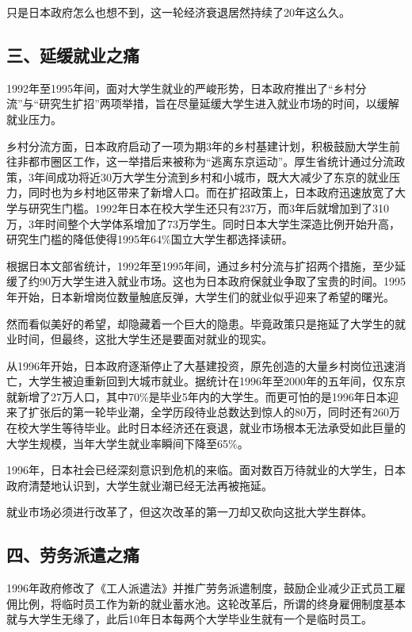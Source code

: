 只是日本政府怎么也想不到，这一轮经济衰退居然持续了20年这么久。

\subsection{三、延缓就业之痛}

1992年至1995年间，面对大学生就业的严峻形势，日本政府推出了“乡村分流”与“研究生扩招”两项举措，旨在尽量延缓大学生进入就业市场的时间，以缓解就业压力。

乡村分流方面，日本政府启动了一项为期3年的乡村基建计划，积极鼓励大学生前往非都市圈区工作，这一举措后来被称为“逃离东京运动”。厚生省统计通过分流政策，3年间成功将近30万大学生分流到乡村和小城市，既大大减少了东京的就业压力，同时也为乡村地区带来了新增人口。而在扩招政策上，日本政府迅速放宽了大学与研究生门槛。1992年日本在校大学生还只有237万，而3年后就增加到了310万，3年时间整个大学体系增加了73万学生。同时日本大学生深造比例开始升高，研究生门槛的降低使得1995年64\%国立大学生都选择读研。

根据日本文部省统计，1992年至1995年间，通过乡村分流与扩招两个措施，至少延缓了约90万大学生进入就业市场。这也为日本政府保就业争取了宝贵的时间。1995年开始，日本新增岗位数量触底反弹，大学生们的就业似乎迎来了希望的曙光。

然而看似美好的希望，却隐藏着一个巨大的隐患。毕竟政策只是拖延了大学生的就业时间，但最终，这批大学生还是要面对就业的现实。

从1996年开始，日本政府逐渐停止了大基建投资，原先创造的大量乡村岗位迅速消亡，大学生被迫重新回到大城市就业。据统计在1996年至2000年的五年间，仅东京就新增了27万人口，其中70\%是毕业5年内的大学生。而更可怕的是1996年日本迎来了扩张后的第一轮毕业潮，全学历段待业总数达到惊人的80万，同时还有260万在校大学生等待毕业。此时日本经济还在衰退，就业市场根本无法承受如此巨量的大学生规模，当年大学生就业率瞬间下降至65\%。

1996年，日本社会已经深刻意识到危机的来临。面对数百万待就业的大学生，日本政府清楚地认识到，大学生就业潮已经无法再被拖延。

就业市场必须进行改革了，但这次改革的第一刀却又砍向这批大学生群体。

\subsection{四、劳务派遣之痛}

1996年政府修改了《工人派遣法》并推广劳务派遣制度，鼓励企业减少正式员工雇佣比例，将临时员工作为新的就业蓄水池。这轮改革后，所谓的终身雇佣制度基本就与大学生无缘了，此后10年日本每两个大学毕业生就有一个是临时员工。

